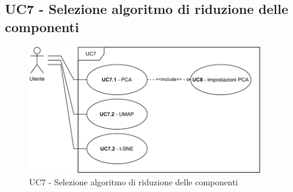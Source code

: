 \subsection{UC7 - Selezione algoritmo di riduzione delle componenti}
    \label{uc7}
    
    \begin{figure}[htbp]
        \centering
        \includegraphics[width=0.9\textwidth]{source/sections/casi-uso/diagrams/uc7.pdf}
        \caption{UC7 - Selezione algoritmo di riduzione delle componenti}
        \label{fig:uc7}
    \end{figure}
    
